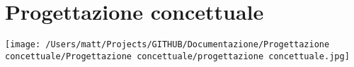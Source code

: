 \chapter{Progettazione concettuale}


\texttt{[image: /Users/matt/Projects/GITHUB/Documentazione/Progettazione concettuale/Progettazione concettuale/progettazione concettuale.jpg]}
